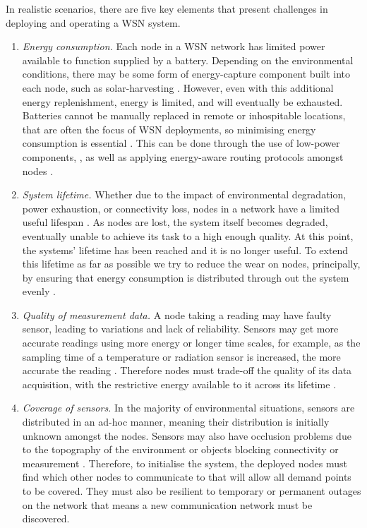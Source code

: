 \ifdefined\DEBUG {} \else \fi
In realistic scenarios, there are five key elements that present challenges in deploying and operating a WSN system.
\begin{enumerate}
\item \textit{Energy consumption.} Each node in a WSN network has limited power available to function supplied by a battery. Depending on the environmental conditions, there may be some form of energy-capture component built into each node, such as solar-harvesting \citep{Prauzek2018}. However, even with this additional energy replenishment, energy is limited, and will eventually be exhausted. Batteries cannot be manually replaced in remote or inhospitable locations, that are often the focus of WSN deployments, so minimising energy consumption is essential \citep{Anastasi2009}. This can be done through the use of low-power components, \citep{4772585, 8108667}, as well as applying energy-aware routing protocols amongst nodes \citep{s90100445}. 

\item \textit{System lifetime.} Whether due to the impact of environmental degradation, power exhaustion, or connectivity loss, nodes in a network have a limited useful lifespan \citep{Mak2009}. As nodes are lost, the system itself becomes degraded, eventually unable to achieve its task to a high enough quality. At this point, the systems' lifetime has been reached and it is no longer useful. To extend this lifetime as far as possible we try to reduce the wear on nodes, principally, by ensuring that energy consumption is distributed through out the system evenly \citep{BABAYO20171176, Engmann2018}.

\item \textit{Quality of measurement data.} A node taking a reading may have faulty sensor, leading to variations and lack of reliability. Sensors may get more accurate readings using more energy or longer time scales, for example, as the sampling time of a temperature or radiation sensor is increased, the more accurate the reading \citep{s17061221}. Therefore nodes must trade-off the quality of its data acquisition, with the restrictive energy available to it across its lifetime \citep{7845391}.

\item \textit{Coverage of sensors.} In the majority of environmental situations, sensors are distributed in an ad-hoc manner, meaning their distribution is initially unknown amongst the nodes. Sensors may also have occlusion problems due to the topography of the environment or objects blocking connectivity or measurement \citep{10.1007/978-3-540-69170-9_23}. Therefore, to initialise the system, the deployed nodes must find which other nodes to communicate to that will allow all demand points to be covered. They must also be resilient to temporary or permanent outages on the network that means a new communication network must be discovered. 


\end{enumerate}
